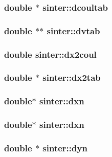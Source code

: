 \subsubsection{\setlength{\rightskip}{0pt plus 5cm}double $\ast$ {\bf sinter::dcoultab}}\label{structsinter_622a6d3d53fd25960f076b2d304a20e6}


\subsubsection{\setlength{\rightskip}{0pt plus 5cm}double $\ast$$\ast$ {\bf sinter::dvtab}}\label{structsinter_d9da6c937a855ba45fe6474718651bd6}


\subsubsection{\setlength{\rightskip}{0pt plus 5cm}double {\bf sinter::dx2coul}}\label{structsinter_e07b7b20bbb54cfb15ed56fe0cc71498}


\subsubsection{\setlength{\rightskip}{0pt plus 5cm}double $\ast$ {\bf sinter::dx2tab}}\label{structsinter_4b7d3e71396917ecd221d8937d62f6a0}


\subsubsection{\setlength{\rightskip}{0pt plus 5cm}double$\ast$ {\bf sinter::dxn}}\label{structsinter_e70abd0c48fc08abc5887641658be6af}


\subsubsection{\setlength{\rightskip}{0pt plus 5cm}double$\ast$ {\bf sinter::dxn}}\label{structsinter_e70abd0c48fc08abc5887641658be6af}


\subsubsection{\setlength{\rightskip}{0pt plus 5cm}double $\ast$ {\bf sinter::dyn}}\label{structsinter_114c75082f9696686317ee4934f67d31}


